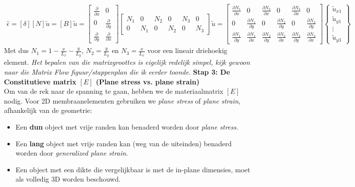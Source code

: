 \documentclass[a4paper,11pt,twoside]{report}
\begin{document}
\begin{align*}
    \hat{\epsilon} = [\delta][N]\tilde{u} = [B]\tilde{u} = \begin{bmatrix} \frac{\partial}{\partial x} & 0 \\ 0 & \frac{\partial}{\partial y} \\ \frac{\partial}{\partial y} & \frac{\partial}{\partial x} \end{bmatrix} \begin{bmatrix} N_1 & 0 & N_2 & 0 & N_3 & 0 \\ 0 & N_1 & 0 & N_2 & 0 & N_3 \end{bmatrix} \tilde{u} = \begin{bmatrix} \frac{\partial N_1}{\partial x} & 0 & \frac{\partial N_2}{\partial x} & 0 & \frac{\partial N_3}{\partial x} & 0 \\ 0 & \frac{\partial N_1}{\partial y} & 0 & \frac{\partial N_2}{\partial y} & 0 & \frac{\partial N_3}{\partial y} \\ \frac{\partial N_1}{\partial y} & \frac{\partial N_1}{\partial x} & \frac{\partial N_2}{\partial y} & \frac{\partial N_2}{\partial x} & \frac{\partial N_3}{\partial y} & \frac{\partial N_3}{\partial x} \end{bmatrix} \begin{Bmatrix} \tilde{u}_{x1} \\ \tilde{u}_{y1} \\ \vdots \\ \tilde{u}_{y3} \end{Bmatrix}
\end{align*}
Met dus $N_1 = 1 - \frac{x}{L_x} - \frac{y}{L_y}$, $N_2 = \frac{y}{L_y}$ en $N_3 = \frac{x}{L_x}$
voor een lineair driehoekig element.
\newline
\textit{Het bepalen van die matrixgroottes is eigelijk redelijk simpel, kijk gewoon naar die Matrix
    Flow figuur/stappenplan die ik eerder toonde.}
\newline
\newline
\textbf{Stap 3: De Constitutieve matrix $[E]$ (Plane stress vs. plane strain)} \\
Om van de rek naar de spanning te gaan, hebben we de materiaalmatrix $[E]$ nodig. Voor 2D
membraanelementen gebruiken we \textit{plane stress} of \textit{plane strain}, afhankelijk van de
geometrie:
\begin{itemize}
    \item Een \textbf{dun} object met vrije randen kan benaderd worden door \textit{plane stress}.
    \item Een \textbf{lang} object met vrije randen kan (weg van de uiteinden) benaderd worden door
          \textit{generalized plane strain}.
    \item Een object met een dikte die vergelijkbaar is met de in-plane dimensies, moet als volledig
          3D worden beschouwd.
\end{itemize}
\end{document}
